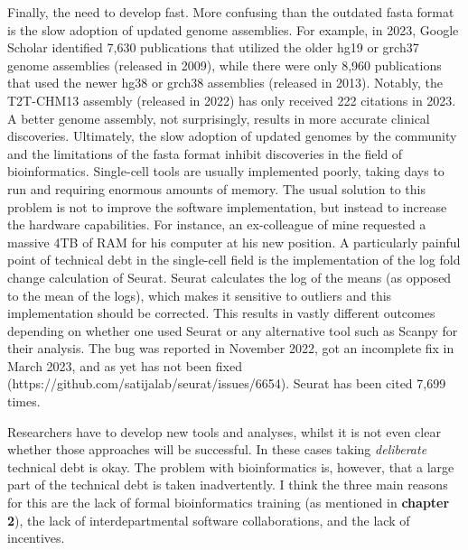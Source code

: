 \bigbreak
Finally, the need to develop fast.  More confusing than the outdated fasta format is the slow adoption of updated genome assemblies. For example, in 2023, Google Scholar identified 7,630 publications that utilized the older hg19 or grch37 genome assemblies (released in 2009), while there were only 8,960 publications that used the newer hg38 or grch38 assemblies (released in 2013). Notably, the T2T-CHM13 assembly (released in 2022) has only received 222 citations in 2023. A better genome assembly, not surprisingly, results in more accurate clinical discoveries\cite{Aganezov2022}. Ultimately, the slow adoption of updated genomes by the community and the limitations of the fasta format inhibit discoveries in the field of bioinformatics. Single-cell tools are usually implemented poorly, taking days to run and requiring enormous amounts of memory\cite{Pratapa_2020}. The usual solution to this problem is not to improve the software implementation, but instead to increase the hardware capabilities. For instance, an ex-colleague of mine requested a massive 4TB of RAM for his computer at his new position. A particularly painful point of technical debt in the single-cell field is the implementation of the log fold change calculation of Seurat. Seurat calculates the log of the means (as opposed to the mean of the logs), which makes it sensitive to outliers and this implementation should be corrected. This results in vastly different outcomes depending on whether one used Seurat or any alternative tool such as Scanpy for their analysis. The bug was reported in November 2022, got an incomplete fix in March 2023, and as yet has not been fixed (https://github.com/satijalab/seurat/issues/6654). Seurat has been cited 7,699 times.


Researchers have to develop new tools and analyses, whilst it is not even clear whether those approaches will be successful. In these cases taking \textit{deliberate} technical debt is okay. The problem with bioinformatics is, however, that a large part of the technical debt is taken inadvertently. I think the three main reasons for this are the lack of formal bioinformatics training (as mentioned in \textbf{chapter 2}), the lack of interdepartmental software collaborations, and the lack of incentives. 


